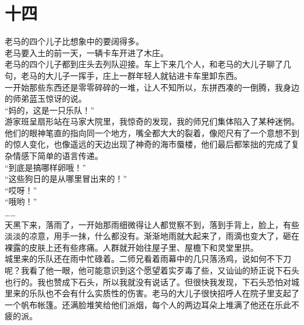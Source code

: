 \fancyhead[RO]{\thepage} %
\fancyhead[LE]{\thepage} %
\fancyfoot[LE,RO]{}
\fancyfoot[LO,CE]{}
\fancyfoot[CO,RE]{}
\chapter*{十四}
老马的四个儿子比想象中的要阔得多。\\

老马要入土的前一天，一辆卡车开进了木庄。\\

老马的四个儿子都到庄头去列队迎接。车上下来几个人，和老马的大儿子聊了几句，老马的大儿子一挥手，庄上一群年轻人就钻进卡车里卸东西。\\

一开始那些东西还是零零碎碎的一堆，让人不知所以，东拼西凑的一倒腾，我身边的师弟蓝玉惊讶的说。\\

“妈的，这是一只乐队！”\\

游家班呈扇形站在马家大院里，我惊奇的发现，我的师兄们集体陷入了某种迷惘。他们的眼神笔直的指向同一个地方，嘴全都大大的裂着，像咫尺有了一个意想不到的惊人变化，也像遥远的天边出现了神奇的海市蜃楼，他们最后都笨拙的完成了复杂情感下简单的语言传递。\\

“到底是搞哪样卵哦！”\\

“这些狗日的是从哪里冒出来的！”\\

“哎呀！”\\

“哦哟！”\\

……\\

天黑下来，落雨了，一开始那雨细微得让人都觉察不到，落到手背上，脸上，有些淡淡的凉意，用手一抹，什么都没有。渐渐地雨就大起来了，雨滴也变大了，砸在裸露的皮肤上还有些疼痛。人群就开始往屋子里、屋檐下和灵堂里拱。\\

城里来的乐队还在雨中忙碌着。二师兄看着雨幕中的几只落汤鸡，说如何不下刀呢？我看了他一眼，他可能意识到这个愿望着实歹毒了些，又讪讪的矫正说下石头也行的。我也赞成下石头，所以我就没有说话了。但很快我发现，下石头恐怕对城里来的乐队也不会有什么实质性的伤害。老马的大儿子很快招呼人在院子里支起了一个帆布帐篷。还满脸堆笑给他们派烟，每个人的两边耳朵上堆满了他还在乐此不疲的派。\\

